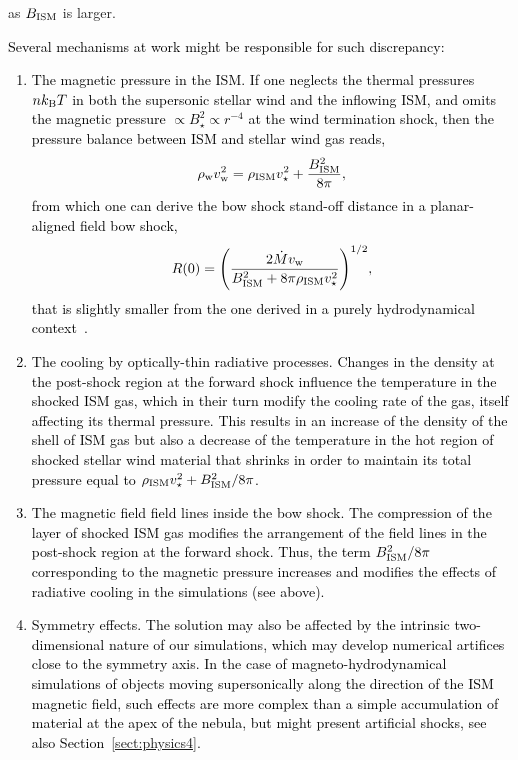 \documentclass[useAMS,usenatbib]{mn2e}
\begin{document}
as $B_{\rm ISM}$ is larger. \textcolor{black}{Several mechanisms at work might be 
responsible for such discrepancy:
%
\begin{enumerate}
%
\item The magnetic pressure in the ISM. If one neglects the thermal pressures $nk_{\rm B}T$ 
      in both the supersonic stellar wind and the inflowing ISM, and omits the magnetic 
      pressure $\propto B_{\star}^{2} \propto r^{-4}$ at the wind termination shock,  
      then the pressure balance between ISM and stellar wind gas reads, 
%
\begin{equation}
	\rho_{\rm w} v_{\mathrm{w}}^{2} = \rho_{\rm ISM} v_{\star}^{2} + \frac{B_{\rm ISM}^{2}}{8\pi},
\label{eq:pressures}
\end{equation}
%
from which one can derive the bow shock stand-off distance in a planar-aligned field bow shock,
%
\begin{equation}
	R(0) = \Bigg( \frac{2\dot{M}v_{\mathrm{w}}}{ B_{\rm ISM}^{2} + 8\pi \rho_{\mathrm{ISM}}v_{\star}^{2} }\Bigg)^{1/2},
	\label{eq:Romag}
\end{equation}
%
that is slightly smaller from the one derived in a purely hydrodynamical context~\citep{wilkin_459_apj_1996}.  
%
\item The cooling by optically-thin radiative processes. Changes in the density at the 
      post-shock region at the forward shock influence the temperature in the shocked ISM gas, 
      which in their turn modify the cooling rate of the gas, itself affecting its thermal 
      pressure. This results in an increase of the density of the shell of ISM gas but also a decrease 
      of the temperature in the hot region of shocked stellar wind material that shrinks in order 
      to maintain its total pressure equal to $\rho_{\rm ISM} v_{\star}^{2}+B_{\rm ISM}^{2}/8\pi$. 
%
\item The magnetic field field lines inside the bow shock. The compression of the layer of shocked ISM gas 
      modifies the arrangement of the field lines in the post-shock region at the forward shock. 
      Thus, the term $B_{\rm ISM}^{2}/8\pi$ corresponding to the magnetic pressure increases and modifies 
      the effects of radiative cooling in the simulations (see above). 
%       
\item Symmetry effects. The solution may also be affected by the intrinsic two-dimensional nature of 
      our simulations, which may develop numerical artifices close to the symmetry axis. In the case 
      of magneto-hydrodynamical simulations of objects moving supersonically along the direction 
      of the ISM magnetic field, such effects are more complex than a simple accumulation of material 
      at the apex of the nebula, but might present artificial shocks, see also Section~\ref{sect:physics4}.       
%
\end{enumerate}
%
}
\end{document}
